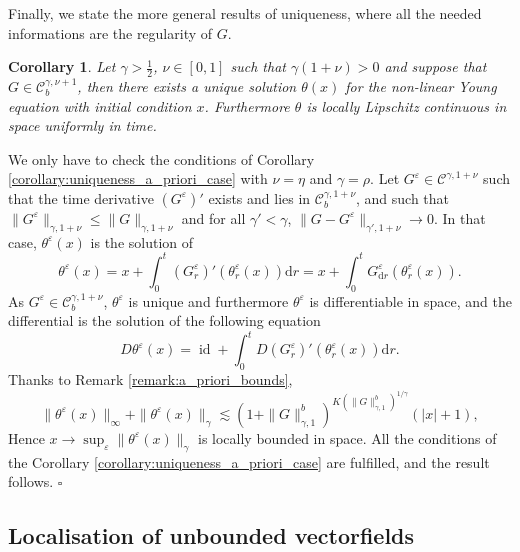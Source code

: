 \documentclass[a4paper,11pt]{article}
\newcommand{\mathd}{\mathrm{d}}
\newcommand{\tmop}[1]{\ensuremath{\operatorname{#1}}}
\newtheorem{corollary}[theorem]{Corollary}
\newenvironment{proof}{{\sc Proof.}}{\hfill$\square$}
\newcommand{\CC}{\mathscr C}
\begin{document}
Finally, we state the more general results of uniqueness, where all the needed
informations are the regularity of $G$.

\begin{corollary}
  Let $\gamma > \frac{1}{2}$, $\nu \in [ 0,1 ]$ such that $\gamma ( 1+ \nu )
  >0$ and suppose that $G \in \CC^{\gamma , \nu +1}_{b}$, then there exists a
  unique solution $\theta ( x )$ for the non-linear Young equation with
  initial condition $x$. Furthermore $\theta$ is locally Lipschitz continuous
  in space uniformly in time.
\end{corollary}

\begin{proof}
  We only have to check the conditions of Corollary
  \ref{corollary:uniqueness_a_priori_case} with $\nu = \eta$ and $\gamma =
  \rho$. Let $G^{\varepsilon} \in \CC^{\gamma ,1+ \nu}$ such that the time
  derivative $( G^{\varepsilon} )'$ exists and lies in $\CC^{\gamma ,1+
  \nu}_{b}$, and such that $\| G^{\varepsilon} \|_{\gamma ,1+ \nu} \leqslant
  \| G \|_{\gamma ,1+ \nu}$ and for all $\gamma' < \gamma$, $\|
  G-G^{\varepsilon} \|_{\gamma' ,1+ \nu} \rightarrow 0$. In that case,
  $\theta^{\varepsilon} ( x )$ is the solution of
  \[ \theta^{\varepsilon} ( x ) =x+ \int_{0}^{t} ( G^{\varepsilon}_{r} )' (
     \theta^{\varepsilon}_{r} ( x ) ) \mathd r=x+ \int_{0}^{t}
     G^{\varepsilon}_{\mathd r} ( \theta^{\varepsilon}_{r} ( x ) ) . \]
  As $G^{\varepsilon} \in \CC^{\gamma ,1+ \nu}_{b}$, $\theta^{\varepsilon}$ is
  unique and furthermore $\theta^{\varepsilon}$ is differentiable in space,
  and the differential is the solution of the following equation
  \[ D \theta^{\varepsilon} ( x ) = \tmop{id} + \int_{0}^{t} D (
     G^{\varepsilon}_{r} )' ( \theta^{\varepsilon}_{r} ( x ) ) \mathd r. \]
  Thanks to Remark \ref{remark:a_priori_bounds},
  \[ \| \theta^{\varepsilon} ( x ) \|_{\infty} + \| \theta^{\varepsilon} ( x )
     \|_{\gamma} \lesssim ( 1+ \| G \|_{\gamma ,1}^{b} )^{K ( \| G
     \|^{b}_{\gamma ,1} )^{1/ \gamma}} ( | x | +1 ) , \]
  Hence $x \rightarrow \sup_{\varepsilon} \| \theta^{\varepsilon} ( x )
  \|_{\gamma}$ is locally bounded in space. All the conditions of the
  Corollary \ref{corollary:uniqueness_a_priori_case} are fulfilled, and the
  result follows.
\end{proof}

\subsection{Localisation of unbounded vectorfields}
\end{document}
